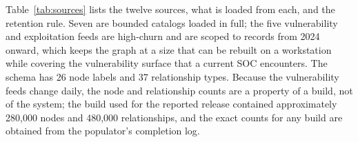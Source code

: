 \documentclass[twocolumn]{svjour3}
\begin{document}
Table~\ref{tab:sources} lists the twelve sources, what is loaded from each, and the retention rule. Seven are bounded catalogs loaded in full; the five vulnerability and exploitation feeds are high-churn and are scoped to records from 2024 onward, which keeps the graph at a size that can be rebuilt on a workstation while covering the vulnerability surface that a current SOC encounters. The schema has 26 node labels and 37 relationship types. Because the vulnerability feeds change daily, the node and relationship counts are a property of a build, not of the system; the build used for the reported release contained approximately 280,000 nodes and 480,000 relationships, and the exact counts for any build are obtained from the populator's completion log. \cite{strom2018mitre,mitreCWE,mitreCAPEC,mitreCVE}
\end{document}
